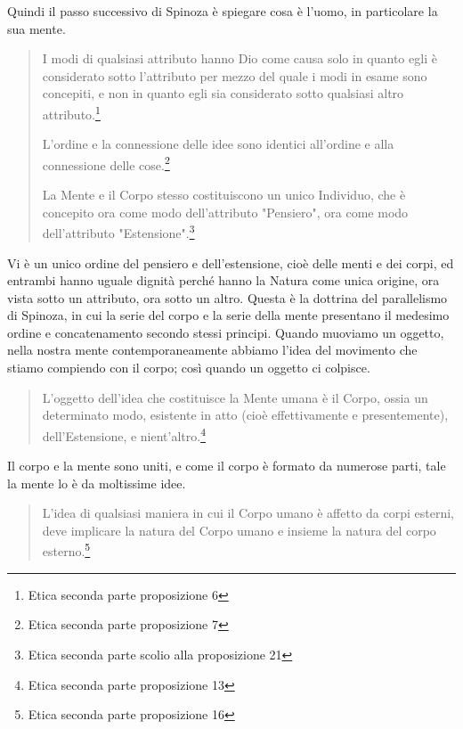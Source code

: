 Quindi il passo successivo di Spinoza è spiegare cosa è l'uomo, in particolare la sua mente.

\begin{quotation}
	\small I modi di qualsiasi attributo hanno Dio come causa solo in quanto egli è considerato sotto l’attributo per mezzo del quale i modi in esame sono concepiti, e non in quanto egli sia considerato sotto qualsiasi altro attributo.\footnote{Etica seconda parte proposizione 6}
	
	\small L’ordine e la connessione delle idee sono identici all’ordine e alla connessione delle cose.\footnote{Etica seconda parte proposizione 7}
	
	\small La Mente e il Corpo stesso costituiscono un unico Individuo,
	che è concepito ora come modo dell’attributo "Pensiero", ora come modo dell’attributo "Estensione".\footnote{Etica seconda parte scolio alla proposizione 21}
	
\end{quotation}
Vi è un unico ordine del pensiero e dell'estensione, cioè delle menti e dei corpi, ed entrambi hanno uguale dignità perché hanno la Natura come unica origine, ora vista sotto un attributo, ora sotto un altro. Questa è la dottrina del parallelismo di Spinoza, in cui la serie del corpo e la serie della mente presentano il medesimo ordine e concatenamento secondo stessi principi. Quando muoviamo un oggetto, nella nostra mente contemporaneamente abbiamo l'idea del movimento che stiamo compiendo con il corpo; così quando un oggetto ci colpisce.

\begin{quotation}
	\small L’oggetto dell’idea che costituisce la Mente umana è il Corpo, ossia un determinato modo, esistente in atto (cioè effettivamente e presentemente), dell’Estensione, e nient’altro.\footnote{Etica seconda parte proposizione 13}
\end{quotation}

Il corpo e la mente sono uniti, e come il corpo è formato da numerose parti, tale la mente lo è da moltissime idee.

\begin{quotation}
	\small L’idea di qualsiasi maniera in cui il Corpo umano è affetto da corpi esterni, deve implicare la natura del Corpo umano e insieme la natura del corpo esterno.\footnote{Etica seconda parte proposizione 16}
\end{quotation}

